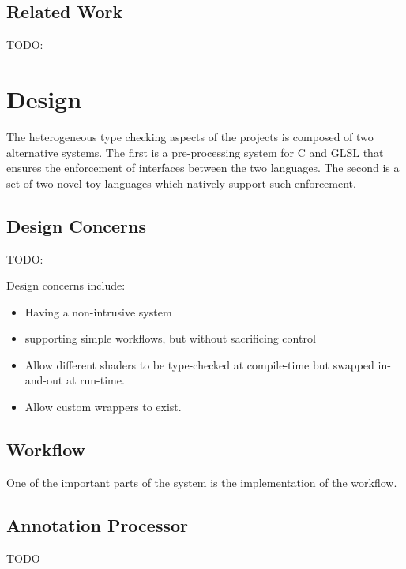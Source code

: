 \documentclass[a4paper,12pt,twoside,openright]{report}
\begin{document}
\section{Related Work}

\label{sec:related_work}

TODO:

\chapter{Design}

The heterogeneous type checking aspects of the projects is composed of two
alternative systems. The first is a pre-processing system for C and GLSL that
ensures the enforcement of interfaces between the two languages. The second is
a set of two novel toy languages which natively support such enforcement.

\section{Design Concerns}

TODO:

Design concerns include:

\begin{itemize}

    \item Having a non-intrusive system

    \item supporting simple workflows, but without sacrificing control

    \item Allow different shaders to be type-checked at compile-time but
    swapped in-and-out at run-time.

    \item Allow custom wrappers to exist.

\end{itemize}

\section{Workflow}

One of the important parts of the system is the implementation of the workflow.

\section{Annotation Processor}

TODO
\end{document}
